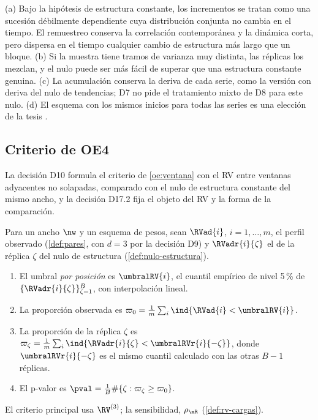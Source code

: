 \begin{observacion}\label{obs:nulo-estructura}
(a) Bajo la hipótesis de estructura constante, los incrementos se tratan como una sucesión
débilmente dependiente cuya distribución conjunta no cambia en el tiempo. El remuestreo conserva
la correlación contemporánea y la dinámica corta, pero dispersa en el tiempo cualquier cambio de
estructura más largo que un bloque. (b) Si la muestra tiene tramos de varianza muy distinta, las
réplicas los mezclan, y el nulo puede ser más fácil de superar que una estructura constante
genuina. (c) La acumulación conserva la deriva de cada serie, como la versión con deriva del nulo
de tendencias; D7 no pide el tratamiento mixto de D8 para este nulo. (d) El esquema con los
mismos inicios para todas las series es una elección de la tesis
.
\end{observacion}

\subsection{Criterio de OE4}
\label{sec:criterio-oe4}

La decisión D10 formula el criterio de \cref{oe:ventana} con el RV entre ventanas adyacentes no
solapadas, comparado con el nulo de estructura constante del mismo ancho, y la decisión D17.2 fija
el objeto del RV y la forma de la comparación.

\begin{definicion}[Criterio de OE4]\label{def:oe4}
Para un ancho $\nw$ y un esquema de pesos, sean $\RVad{i}$, $i=1,\dots,m$, el perfil observado
(\cref{def:pares}, con $d=3$ por la decisión D9) y $\RVadr{i}{\zeta}$ el de la réplica $\zeta$ del
nulo de estructura (\cref{def:nulo-estructura}).
\begin{enumerate}[label=(\alph*)]
  \item El umbral \emph{por posición} es $\umbralRV{i}$, el cuantil empírico de nivel 5\,\% de
    $\{\RVadr{i}{\zeta}\}_{\zeta=1}^{B}$, con interpolación lineal.
  \item La proporción observada es $\varpi_0=\frac1m\sum_i\ind\{\RVad{i}<\umbralRV{i}\}$.
  \item La proporción de la réplica $\zeta$ es
    $\varpi_\zeta=\frac1m\sum_i\ind\{\RVadr{i}{\zeta}<\umbralRVr{i}{-\zeta}\}$, donde
    $\umbralRVr{i}{-\zeta}$ es el mismo cuantil calculado con las otras $B-1$ réplicas.
  \item El p-valor es $\pval=\frac1B\#\{\zeta:\varpi_\zeta\ge\varpi_0\}$.
\end{enumerate}
El criterio principal usa $\RV^{(3)}$; la sensibilidad, $\rho_{\mR}$ (\cref{def:rv-cargas}).
\end{definicion}

